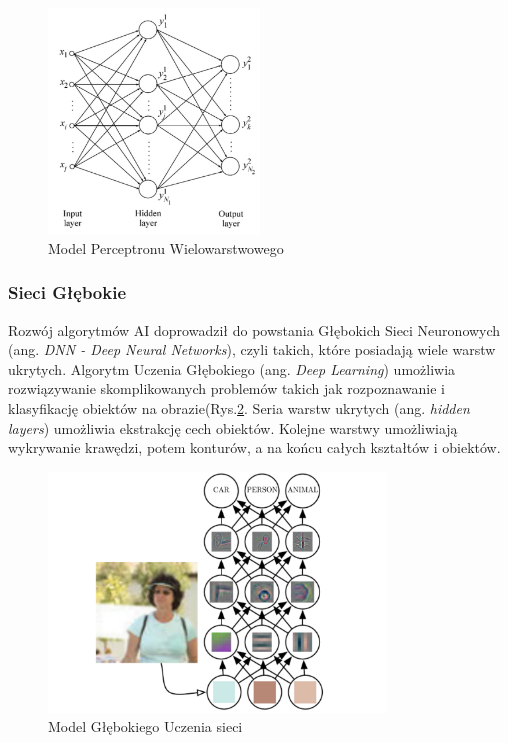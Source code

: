 \begin{figure}
  \centering
  \includegraphics[width=0.5\textwidth]{img/mlp.png}
  \caption{Model Perceptronu Wielowarstwowego}
  \label{mlp}
\end{figure}


\subsubsection{Sieci Głębokie}

Rozwój algorytmów AI doprowadził do powstania Głębokich Sieci Neuronowych (ang. 
\emph{DNN - Deep Neural Networks}), czyli takich, które posiadają wiele 
warstw ukrytych\cite{Goodfellow-et-al-2016}. Algorytm Uczenia Głębokiego (ang. 
\emph{Deep Learning}) umożliwia rozwiązywanie skomplikowanych problemów takich 
jak rozpoznawanie i klasyfikację obiektów na obrazie(Rys.\ref{dnn}. Seria warstw 
ukrytych (ang. \emph{hidden layers}) umożliwia ekstrakcję cech obiektów. 
Kolejne warstwy umożliwiają wykrywanie krawędzi, potem konturów, a na końcu 
całych kształtów i obiektów.

\begin{figure}[!h]
  \centering
  \includegraphics[width=0.8\textwidth]{img/dnn-object-recog.png}
  \caption{Model Głębokiego Uczenia sieci}
  \label{dnn}
\end{figure}


